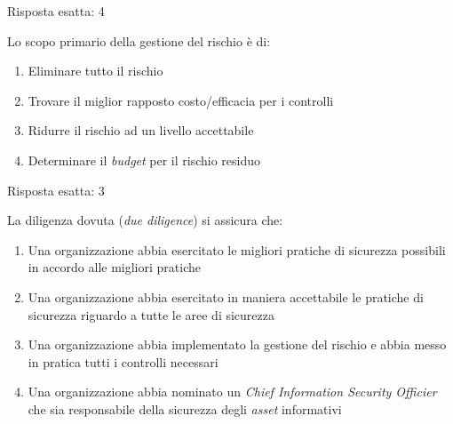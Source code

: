 \begin{Answer} [
  ref={gestRisk7},
  number={7}
  ]

  \Question Risposta esatta: 4

\end{Answer}



\begin{Exercise} [
  title={Quiz},
  label={gestRisk8}
  ]

  \Question Lo scopo primario della gestione del rischio \`e di:
\begin{enumerate}
 \item Eliminare tutto il rischio
 \item Trovare il miglior rapposto costo/efficacia per i controlli
 \item Ridurre il rischio ad un livello accettabile
 \item Determinare il \textit{budget} per il rischio residuo
\end{enumerate}

\end{Exercise}


\begin{Answer} [
  ref={gestRisk8},
  number={8}
  ]

  \Question Risposta esatta: 3

\end{Answer}



\begin{Exercise} [
  title={Quiz},
  label={gestRisk9}
  ]

  \Question La diligenza dovuta (\textit{due diligence}) si assicura che:
\begin{enumerate}
 \item Una organizzazione abbia esercitato le migliori pratiche di sicurezza
possibili in accordo alle migliori pratiche
 \item Una organizzazione abbia esercitato in maniera accettabile le pratiche
di sicurezza riguardo a tutte le aree di sicurezza
 \item Una organizzazione abbia implementato la gestione del rischio e abbia
messo in pratica tutti i controlli necessari
 \item Una organizzazione abbia nominato un \textit{Chief Information Security
Officier} che sia responsabile della sicurezza degli \textit{asset} informativi
\end{enumerate}

\end{Exercise}


